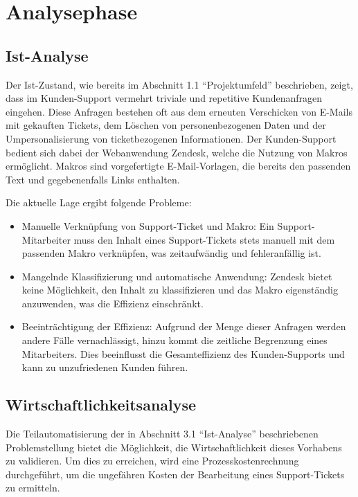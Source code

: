 \section{Analysephase} 
\label{sec:Analysephase}


\subsection{Ist-Analyse} 
\label{sec:IstAnalyse}
Der Ist-Zustand, wie bereits im Abschnitt 1.1 ``Projektumfeld'' beschrieben, 
zeigt, dass im Kunden-Support vermehrt triviale und repetitive Kundenanfragen eingehen. 
Diese Anfragen bestehen oft aus dem erneuten Verschicken von E-Mails mit gekauften Tickets, 
dem Löschen von personenbezogenen Daten und der Umpersonalisierung von 
ticketbezogenen Informationen. Der Kunden-Support bedient sich dabei der Webanwendung Zendesk, 
welche die Nutzung von Makros ermöglicht. Makros sind vorgefertigte E-Mail-Vorlagen, 
die bereits den passenden Text und gegebenenfalls Links enthalten.

Die aktuelle Lage ergibt folgende Probleme:

\begin{itemize}
	\item Manuelle Verknüpfung von Support-Ticket und Makro: Ein Support-Mitarbeiter muss den Inhalt eines Support-Tickets stets manuell mit dem passenden Makro verknüpfen, was zeitaufwändig und fehleranfällig ist.
	\item Mangelnde Klassifizierung und automatische Anwendung: Zendesk bietet keine Möglichkeit, den Inhalt zu klassifizieren und das Makro eigenständig anzuwenden, was die Effizienz einschränkt.
	\item Beeinträchtigung der Effizienz: Aufgrund der Menge dieser Anfragen werden andere Fälle vernachlässigt, hinzu kommt die zeitliche Begrenzung eines Mitarbeiters. Dies beeinflusst die Gesamteffizienz des Kunden-Supports und kann zu unzufriedenen Kunden führen.
\end{itemize}




\subsection{Wirtschaftlichkeitsanalyse}
\label{sec:Wirtschaftlichkeitsanalyse}

Die Teilautomatisierung der in Abschnitt 3.1 ``Ist-Analyse'' beschriebenen Problemstellung bietet
die Möglichkeit, die Wirtschaftlichkeit dieses Vorhabens zu validieren. Um dies zu erreichen,
wird eine Prozesskostenrechnung durchgeführt, um die ungefähren Kosten der Bearbeitung eines 
Support-Tickets zu ermitteln.

